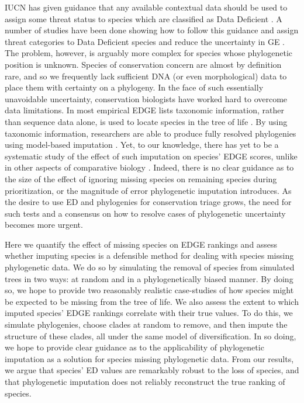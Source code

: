 \documentclass[12pt,english]{article}
\begin{document}
IUCN has given guidance that any available contextual data should be used to
assign some threat status to species which are classified as Data Deficient
\autocite{Iucn2001, Iucn2008}. A number of studies have been done
showing how to follow this guidance and assign threat categories to Data
Deficient species and reduce the uncertainty in GE \autocite{Good2006,
Butchart2010, Morais2013}. The problem, however, is arguably more complex for
species whose phylogenetic position is unknown. Species of conservation concern
are almost by definition rare, and so we frequently lack sufficient DNA (or even
morphological) data to place them with certainty on a phylogeny. In the face of
such essentially unavoidable uncertainty, conservation biologists have worked
hard to overcome data limitations. In most empirical EDGE lists taxonomic
information, rather than sequence data alone, is used to locate species in the
tree of life \autocite{Isaac2007,Collen2011,Isaac2012,Jetz2014,Curnick2015,
Gumbs2017,Stein2018}. By using taxonomic information, researchers are
able to produce fully resolved phylogenies using model-based imputation
\autocite{Kuhn2011, Thomas2013}. Yet, to our knowledge, there has yet to be a
systematic study of the effect of such imputation on species' EDGE scores,
unlike in other aspects of comparative biology \autocite{Rabosky2014}. Indeed,
there is no clear guidance as to the size of the effect of ignoring missing
species on remaining species during prioritization, or the magnitude of error
phylogenetic imputation introduces. As the desire to use ED and phylogenies for
conservation triage grows, the need for such tests and a consensus on how
to resolve cases of phylogenetic uncertainty becomes more urgent.

Here we quantify the effect of missing species on EDGE rankings and assess
whether imputing species is a defensible method for dealing with species missing
phylogenetic data. We do so by simulating the removal of species from simulated
trees in two ways: at random and in a phylogenetically biased manner. By doing
so, we hope to provide two reasonably realistic case-studies of how species
might be expected to be missing from the tree of life. We also assess the extent
to which imputed species' EDGE rankings correlate with their true values. To do
this, we simulate phylogenies, choose clades at random to remove, and then
impute the structure of these clades, all under the same model of
diversification. In so doing, we hope to provide clear guidance as to the
applicability of phylogenetic imputation as a solution for species missing
phylogenetic data. From our results, we argue that species' ED values are
remarkably robust to the loss of species, and that phylogenetic imputation does
not reliably reconstruct the true ranking of species.
\end{document}
